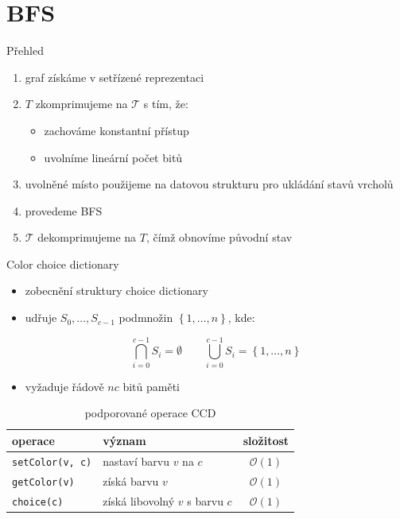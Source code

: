 \documentclass[czech]{beamer}
\begin{document}
	\section{BFS}
	\begin{frame}{Přehled}
		\begin{enumerate}
			\item graf získáme v setřízené reprezentaci
			\item $T$ zkomprimujeme na $\mathcal{T}$ s tím, že:
			\begin{itemize}
				\item zachováme konstantní přístup
				\item uvolníme lineární počet bitů
			\end{itemize}
			\item uvolněné místo použijeme na datovou strukturu pro ukládání stavů vrcholů
			\item provedeme BFS
			\item $\mathcal{T}$ dekomprimujeme na $T$, čímž obnovíme původní stav
		\end{enumerate}
	\end{frame}

	\begin{frame}{Color choice dictionary}
		\begin{itemize}
			\item zobecnění struktury choice dictionary
			\item udřuje $S_0, \ldots, S_{c - 1}$ podmnožin $\left\{1, \ldots, n\right\}$, kde:

				$$\bigcap_{i=0}^{c-1} S_i = \emptyset \qquad\bigcup_{i=0}^{c-1} S_i = \left\{1, \ldots, n\right\}$$

			\item vyžaduje řádově $nc$ bitů paměti
		\end{itemize}

		\vfill

		\begin{table}
			\centering
			\begin{tabular}{llc}
				\toprule
				operace & význam & složitost \\
				\midrule
				\texttt{setColor(v, c)} & nastaví barvu $v$ na $c$        & $\mathcal{O}\left(1\right)$ \\
				\texttt{getColor(v)}    & získá barvu $v$                 & $\mathcal{O}\left(1\right)$ \\
				\texttt{choice(c)}      & získá libovolný $v$ s barvu $c$ & $\mathcal{O}\left(1\right)$ \\
				\bottomrule
			\end{tabular}
			\caption{podporované operace CCD}
		\end{table}
	\end{frame}
\end{document}
